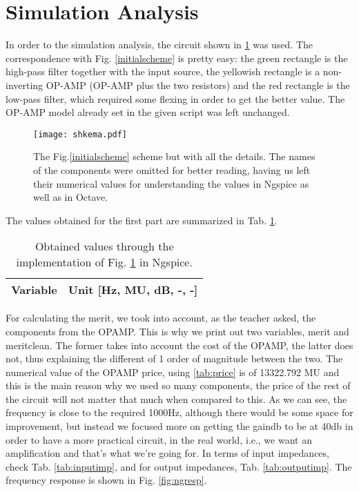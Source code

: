 \section{Simulation Analysis}

In order to the simulation analysis, the circuit shown in \ref{fig:schemescheme} was used. The correspondence with Fig. \ref{initialscheme} is pretty easy: the green rectangle is the high-pass filter together with the input source, the yellowish rectangle is a non-inverting OP-AMP (OP-AMP plus the two resistors) and the red rectangle is the low-pass filter, which required some flexing in order to get the better value. The OP-AMP model already set in the given script was left unchanged.

\begin{figure}[H]
    \centering
    \texttt{[image: shkema.pdf]}
    \caption{The Fig.\ref{initialscheme} scheme but with all the details. The names of the components were omitted for better reading, having us left their numerical values for understanding the values in Ngspice as well as in Octave.}
    \label{fig:schemescheme}
\end{figure}

The values obtained for the first part are summarized in Tab. \ref{tab:valuesng}.

\begin{table}[H]
    \centering 
    \begin{tabular}{|c|c|}
    	\hline
    	Variable & Unit [Hz, MU, dB, -, -]\\ 
    	\hline
         
    \end{tabular}
    \caption{Obtained values through the implementation of Fig. \ref{fig:schemescheme} in Ngspice.}
    \label{tab:valuesng}
\end{table}

For calculating the merit, we took into account, as the teacher asked, the components from the OPAMP. This is why we print out two variables, merit and meritclean. The former takes into account the cost of the OPAMP, the latter does not, thus explaining the different of 1 order of magnitude between the two. The numerical value of the OPAMP price, using \ref{tab:price} is of 13322.792 MU and this is the main reason why we used so many components, the price of the rest of the circuit will not matter that much when compared to this. As we can see, the frequency is close to the required 1000Hz, although there would be some space for improvement, but instead we focused more on getting the gaindb to be at 40db in order to have a more practical circuit, in the real world, i.e., we want an amplification and that's what we're going for. In terms of input impedances, check Tab. \ref{tab:inputimp}, and for output impedances, Tab. \ref{tab:outputimp}. The frequency response is shown in Fig. \ref{fig:ngresp}.

